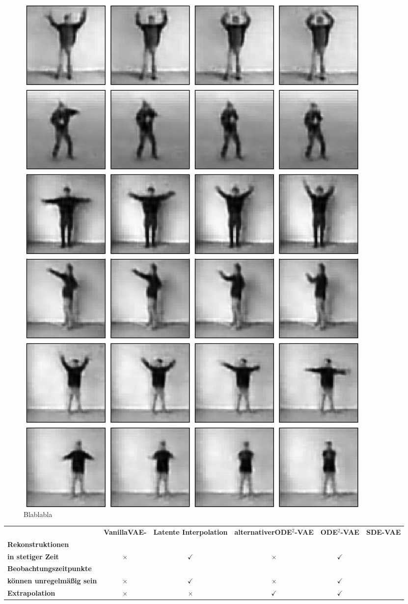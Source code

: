 \documentclass[12pt]{article}
\begin{document}
\begin{figure}
\begin{minipage}[position=r]{0.5\textwidth}
\begin{mdframed}[style=inner]
				\includegraphics[scale=0.47]{movies_extrapolation}
			\end{mdframed}
		\end{minipage}
		\caption{Blablabla}
	\end{figure}
	\newpage


	\begin{table}[htb]
		\begin{center}
			\begin{tabular}{lccccc}\toprule
				\textbf{\ }	&\textbf{VanillaVAE-}	&\textbf{Latente Interpolation}
				&\textbf{alternativerODE$^2$-VAE}
				&\textbf{ODE$^2$-VAE}
				&\textbf{SDE-VAE} \\

				\textbf{Rekonstruktionen} \\ \textbf{in stetiger Zeit}& $\times$	& $\checkmark$ &$\times$ & $\checkmark$	& \\
				\textbf{Beobachtungszeitpunkte}\\ \textbf{können unregelmäßig sein}	& $\times$	&  $\checkmark$ & $\times$ &$\checkmark$	& \\
				\textbf{Extrapolation}	& $\times$	& $\times$ & $\checkmark$ & $\checkmark$	& \\
				\bottomrule
			\end{tabular}
		\end{center}
	\end{table}
\end{document}
